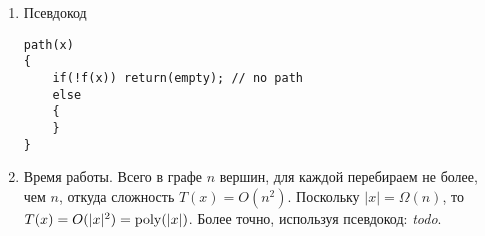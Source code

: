\documentclass[a4paper]{article}
\def\poly{{\rm{poly}}}
\newcommand{\todo}{{\em todo}}
\begin{document}
\begin{enumerate}
\begin{enumerate}
\end{enumerate}
\item Псевдокод
\begin{lstlisting}
path(x)
{
    if(!f(x)) return(empty); // no path
    else
    {
    }
}
\end{lstlisting}
\item Время работы. Всего в графе $n$ вершин, для каждой перебираем не более, чем $n$, откуда сложность $T(x)=O(n^2)$. Поскольку $|x|=\Omega(n)$, то $T(x)=O(|x|^2)=\poly(|x|)$. Более точно, используя псевдокод: \todo.
\end{enumerate}
\end{document}
